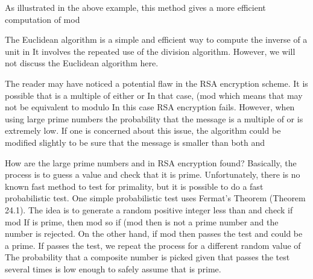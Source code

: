 \documentclass[11pt,oneside]{article}
\begin{document}
\begin{BookBody}
As illustrated in the above example, this method gives a more efficient computation of mod 

The Euclidean algorithm is a simple and efficient way to compute the inverse of a unit in  It involves the repeated use of the division algorithm. However, we will not discuss the Euclidean algorithm here.

The reader may have noticed a potential flaw in the RSA encryption scheme. It is possible that  is a multiple of either  or  In that case,  (mod  which means that  may not be equivalent to  modulo  In this case RSA encryption fails. However, when using large prime numbers the probability that the message is a multiple of  or  is extremely low. If one is concerned about this issue, the algorithm could be modified slightly to be sure that the message is smaller than both  and 

How are the large prime numbers  and  in RSA encryption found? Basically, the process is to guess a value and check that it is prime. Unfortunately, there is no known fast method to test for primality, but it is possible to do a fast probabilistic test. One simple probabilistic test uses Fermat’s Theorem (Theorem 24.1). The idea is to generate a random positive integer less than  and check if mod  If  is prime, then mod  so if  (mod  then  is not a prime number and the number  is rejected. On the other hand, if mod  then  passes the test and  could be a prime. If  passes the test, we repeat the process for a different random value of  The probability that a composite number  is picked given that  passes the test several times is low enough to safely assume that  is prime.

\end{BookBody}

\BookNarrativefalse
\end{document}
